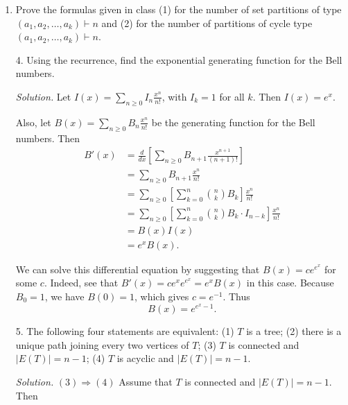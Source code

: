 \documentclass[11pt,letterpaper]{article}
\newenvironment{solution}{\color{Violet}\textit{Solution.}}{\color{black}}
\begin{document}
\begin{enumerate}
\begin{solution}
        Because these cases are exhaustive and disjoint, we conclude that
        \[
            S(n,k) = S(n-1,k-1) + k\cdot S(n-1,k).
        \] \qed
    \end{solution}

    \item Prove the formulas given in class (1) for the number of set partitions of type $(a_1,a_2,\dots,a_k) \vdash n$ and (2) for the number of partitions of cycle type $(a_1,a_2,\dots,a_k) \vdash n$.
    
    \item[4.] Using the recurrence, find the exponential generating function for the Bell numbers.
    
    \begin{solution}
        Let $I(x) = \sum_{n\geq 0} I_n \frac{x^n}{n!}$, with $I_k=1$ for all $k$. Then $I(x)=e^x$.

        Also, let $B(x) = \sum_{n\geq 0} B_n \frac{x^n}{n!}$ be the generating function for the Bell numbers. Then
        \begin{align*}
            B'(x) &= \frac{d}{dx}\left[ \sum_{n\geq 0} B_{n+1} \frac{x^{n+1}}{(n+1)!} \right] \\
            &= \sum_{n\geq 0} B_{n+1} \frac{x^{n}}{n!} \\
            &= \sum_{n\geq 0} \left[ \sum_{k=0}^n \binom{n}{k} B_k \right] \frac{x^{n}}{n!} \\
            &= \sum_{n\geq 0} \left[ \sum_{k=0}^n \binom{n}{k} B_k \cdot I_{n-k} \right] \frac{x^{n}}{n!} \\
            &= B(x)I(x) \\
            &= e^x B(x).
        \end{align*}

        We can solve this differential equation by suggesting that $B(x)=ce^{e^x}$ for some $c$. Indeed, see that $B'(x)=ce^xe^{e^x}=e^x B(x)$ in this case. Because $B_0=1$, we have $B(0)=1$, which gives $c=e^{-1}$. Thus
        \[
        B(x)=e^{e^x-1}.
        \]
    \end{solution}
    
    \item[5.] The following four statements are equivalent:  (1)  $T$ is a tree; (2) there is a unique path joining every two vertices of $T$; (3) $T$ is connected and $|E(T)| = n-1$; (4) $T$ is acyclic and $|E(T)| = n-1$.

    \begin{solution}
        $(3)\Rightarrow(4)$ Assume that $T$ is connected and $|E(T)| = n-1$. Then 


\end{solution}
\end{enumerate}
\end{document}
